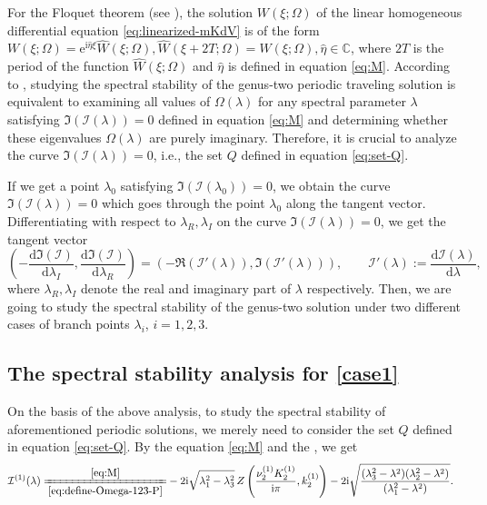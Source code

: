 \documentclass[11pt,reqno]{amsart}
\newcommand{\ii}{\mathrm{i}}
\newcommand{\ee}{\mathrm{e}}
\newcommand{\dd}{\mathrm{d}}
\numberwithin{equation}{section}
\begin{document}
For the Floquet theorem (see \cite{DeconinckK-06,Floquet-83}), the solution $W(\xi;\Omega)$ of the linear homogeneous differential equation \eqref{eq:linearized-mKdV} is of the form
$W(\xi;\Omega)=\ee^{\ii \hat{\eta} \xi} \hat{W}(\xi;\Omega), \hat{W}(\xi+2T;\Omega)=\hat{W}(\xi;\Omega),\hat{\eta}\in \mathbb{C}$,
where $2T$ is the period of the function $\hat{W}(\xi ;\Omega )$ and $\hat{\eta}$ is defined in equation \eqref{eq:M}.
According to , studying the spectral stability of the genus-two periodic traveling solution is equivalent to
examining all values of $\Omega(\lambda)$ for any spectral parameter $\lambda$ satisfying $\Im(\mathcal{I}(\lambda))=0$ defined in equation \eqref{eq:M} and determining whether these eigenvalues $\Omega(\lambda)$ are purely imaginary.
Therefore, it is crucial to analyze the curve $\Im(\mathcal{I}(\lambda))=0$, i.e., the set $Q$ defined in equation \eqref{eq:set-Q}.

If we get a point $\lambda_0$ satisfying $\Im(\mathcal{I}(\lambda_0))=0$, we obtain the curve $\Im(\mathcal{I}(\lambda))=0$ which goes through the point $\lambda_0$ along the tangent vector.
Differentiating with respect to ${\lambda}_{R},{\lambda}_{I}$ on the curve ${\Im}\left(\mathcal{I}(\lambda) \right)=0$, we get the tangent vector 
\begin{equation}\label{eq:tangent-vector}
	\left(-\frac{\dd {\Im} (\mathcal{I})}{\dd \lambda_{I}}, \frac{\dd {\Im} (\mathcal{I})}{\dd \lambda_{R}} \right)= \left(-{\Re}(\mathcal{I}'(\lambda)), {\Im}(\mathcal{I}'(\lambda)) \right), \qquad \mathcal{I}'(\lambda):=\frac{\dd \mathcal{I}(\lambda)}{\dd \lambda},
\end{equation}   
where $\lambda_{R},\lambda_{I}$ denote the real and imaginary part of $\lambda$ respectively. 
Then, we are going to study the spectral stability of the genus-two solution under two different cases of branch points $\lambda_i$, $i=1,2,3$.



\subsection{The spectral stability analysis for \ref{case1}}\label{subsec:spectral-dn}
On the basis of the above analysis, to study the spectral stability of aforementioned periodic solutions, we merely need to consider the set $Q$ defined in equation \eqref{eq:set-Q}. 
By the equation \eqref{eq:M} and the , we get 
\begin{equation}\label{eq:I-define-P-dn}
	\begin{split}
		\mathcal{I}^{(1)}(\lambda)\xlongequal[\eqref{eq:define-Omega-123-P}]{\eqref{eq:M}}&-2\ii \sqrt{\lambda_1^2-\lambda_3^2}\, Z\left(\frac{ \nu^{(1)} _2  K^{(1)}_2}{\ii \pi},  k^{(1)}_2\right)-2\ii \sqrt{\frac{(\lambda_3^2-\lambda^2)(\lambda_2^2-\lambda^2)}{(\lambda_1^2-\lambda^2)}}.
	\end{split}
\end{equation}
\end{document}
